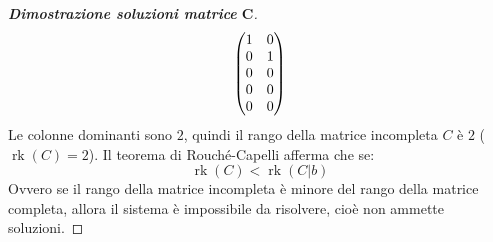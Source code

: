 \documentclass[a4paper]{article}
\makeatletter
\DeclareMathOperator{\rk}{rk}
\newenvironment{rowequmat}[1]{\left(\array{@{}#1@{}}}{\endarray\right)}
\makeatother
\begin{document}
\begin{proof}[\textbf{Dimostrazione soluzioni matrice} $\boldsymbol{C}$]
\begin{gather*}
			\begin{rowequmat}{cc}
				1 & 0 \\
				0 & 1 \\
				0 & 0 \\
				0 & 0 \\
				0 & 0
			\end{rowequmat}
		\end{gather*}
		Le colonne dominanti sono $2$, quindi il rango della matrice incompleta $C$ è $2$ ($\rk\left(C\right) = 2$). Il teorema di Rouché-Capelli afferma che se:
		\begin{equation*}
			\rk\left(C\right) < \rk\left(C|b\right)
		\end{equation*}
		Ovvero se il rango della matrice incompleta è minore del rango della matrice completa, allora il sistema è impossibile da risolvere, cioè non ammette soluzioni.
	\end{proof}\newpage
\end{document}
